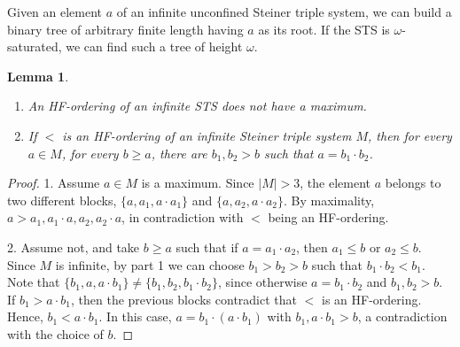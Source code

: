 \documentclass[a4paper, 11pt]{article}
\theoremstyle{note}
\newtheorem{lemma}[thm]{Lemma}
\begin{document}
Given an element $a$ of an infinite unconfined Steiner triple system, we can build a binary tree of arbitrary finite length having $a$ as its root. If the STS is $\omega$-saturated, we can find such a tree of height $\omega$.



\begin{lemma}\label{tree2}
	\begin{enumerate}
		\item An HF-ordering of an infinite STS does not have a maximum.
		\item If $<$ is an HF-ordering of an infinite Steiner triple system $M$, then for every $a\in M$, for every  $b \geq a$, there are $b_1,b_2>b$ such that  $a=b_1\cdot b_2$.
	\end{enumerate}
\end{lemma}
\begin{proof}
	1. Assume $a\in M$ is a maximum. Since $|M|>3$, the element $a$ belongs to two different blocks, $\{a,a_1,a\cdot a_1\}$ and $\{a,a_2,a\cdot a_2\}$.  By maximality, $a> a_1,a_1\cdot a, a_2, a_2\cdot a$, in contradiction with $<$ being an HF-ordering.
	
	2. Assume not, and take $b \geq a$ such that  if $a=a_1\cdot a_2$, then $a_1\leq b$ or $a_2\leq b$. Since $M$ is infinite, by part 1 we can choose $b_1>b_2>b$ such that  $b_1\cdot b_2<b_1$. Note that $\{b_1,a,a\cdot b_1\}\neq \{b_1,b_2, b_1\cdot b_2 \}$, since otherwise $a=b_1\cdot b_2$ and  $b_1,b_2>b$. If $b_ 1> a\cdot b_1$, then  the previous blocks contradict that $<$ is an HF-ordering. Hence, $b_1<a\cdot b_1$. In this case, $a= b_1\cdot (a\cdot b_1)$  with $b_1,a\cdot b_1>b$, a contradiction with the choice of $b$.
\end{proof}
\end{document}

